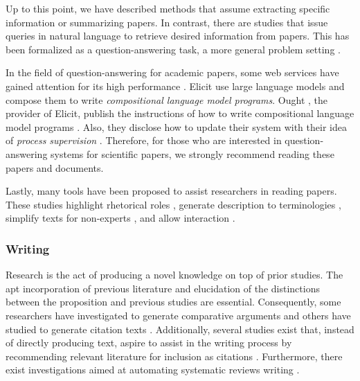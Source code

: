 Up to this point, we have described methods that assume extracting specific information or summarizing papers. In contrast, there are studies that issue queries in natural language to retrieve desired information from papers. This has been formalized as a question-answering task, a more general problem setting \cite{lu2022learn,ruggeri2022argscichat,saikh2022scienceqa}. 

In the field of question-answering for academic papers, some web services have gained attention for its high performance \cite{elicit,scispace}. Elicit use large language models and compose them to write \textit{compositional language model programs}. Ought \cite{ought}, the provider of Elicit, publish the instructions of how to write compositional language model programs \cite{primer2022}. Also, they disclose how to update their system with their idea of \textit{process supervision} \cite{reppert2023iterated}. Therefore, for those who are interested in question-answering systems for scientific papers, we strongly recommend reading these papers and documents.

Lastly, many tools have been proposed to assist researchers in reading papers. These studies highlight rhetorical roles \cite{fok2023scim,lauscher2018arguminsci}, generate description to terminologies \cite{august2022generating,head2021augmenting,murthy2022accord}, simplify texts for non-experts \cite{august2022paper,jeblick2022chatgpt}, and allow interaction \cite{kang2022threddy,elicit,scispace}.

\subsubsection{Writing}
Research is the act of producing a novel knowledge on top of prior studies. The apt incorporation of previous literature and elucidation of the distinctions between the proposition and previous studies are essential. Consequently, some researchers have investigated to generate comparative arguments \cite{yu2022scientific} and others have studied to generate citation texts \cite{arita2022citation,gu2022controllable,wang2021autocite,xing2020automatic,funkquist2022citebench}. Additionally, several studies exist that, instead of directly producing text, aspire to assist in the writing process by recommending relevant literature for inclusion as citations \cite{farber2020citation,zhang2020dual,duma2019contextual,farber2018cite,gosangi2021use}. Furthermore, there exist investigations aimed at automating systematic reviews writing \cite{dones2022systematic}.

